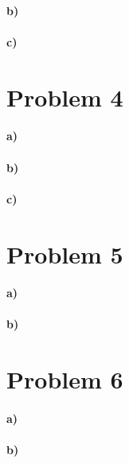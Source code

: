 \documentclass[12pt]{article}
\begin{document}
\paragraph{b)}

\paragraph{c)}

\section*{Problem 4}

\paragraph{a)}

\paragraph{b)}

\paragraph{c)}

\section*{Problem 5}

\paragraph{a)}

\paragraph{b)}

\section*{Problem 6}

\paragraph{a)}

\paragraph{b)}
\end{document}
